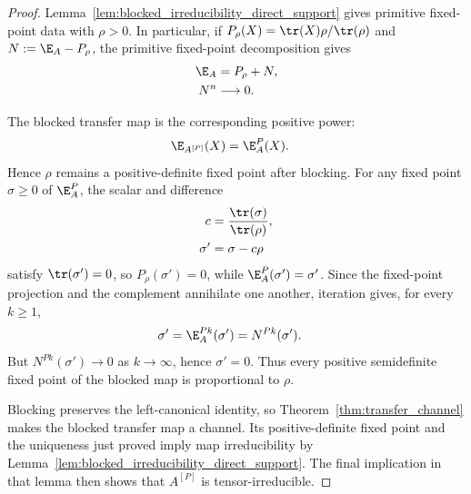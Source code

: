 \begin{proof}\leanok
    Lemma~\ref{lem:blocked_irreducibility_direct_support} gives primitive
    fixed-point data with $\rho>0$. In particular, if
    $P_\rho(X)=\tr(X)\rho/\tr(\rho)$ and $N:=\E_A-P_\rho$, the primitive
    fixed-point decomposition gives
    \begin{align}
        \E_A
         & =P_\rho+N,
        \notag               \\
        N^n
         & \longrightarrow0.
        \notag
    \end{align}

    The blocked transfer map is the corresponding positive power:
    \begin{align}
        \E_{A^{[P]}}(X)
         & =\E_A^P(X).
        \label{eq:canonical_block_transfer_power}
    \end{align}
    Hence $\rho$ remains a positive-definite fixed point after blocking. For
    any fixed point $\sigma\ge0$ of $\E_A^P$, the scalar and difference
    \begin{align}
        c
         & =\frac{\tr(\sigma)}{\tr(\rho)},
        \notag                             \\
        \sigma'
         & =\sigma-c\rho
        \notag
    \end{align}
    satisfy $\tr(\sigma')=0$, so $P_\rho(\sigma')=0$, while
    $\E_A^P(\sigma')=\sigma'$. Since the fixed-point projection and the
    complement annihilate one another, iteration gives, for every $k\ge1$,
    \begin{align}
        \sigma'
         & =\E_A^{Pk}(\sigma')
        =N^{Pk}(\sigma').
        \notag
    \end{align}
    But $N^{Pk}(\sigma')\to0$ as $k\to\infty$, hence $\sigma'=0$. Thus every
    positive semidefinite fixed point of the blocked map is proportional to
    $\rho$.

    Blocking preserves the left-canonical identity, so
    Theorem~\ref{thm:transfer_channel} makes the blocked transfer map a channel.
    Its positive-definite fixed point and the uniqueness just proved imply map
    irreducibility by
    Lemma~\ref{lem:blocked_irreducibility_direct_support}. The final implication
    in that lemma then shows that $A^{[P]}$ is tensor-irreducible.
\end{proof}


